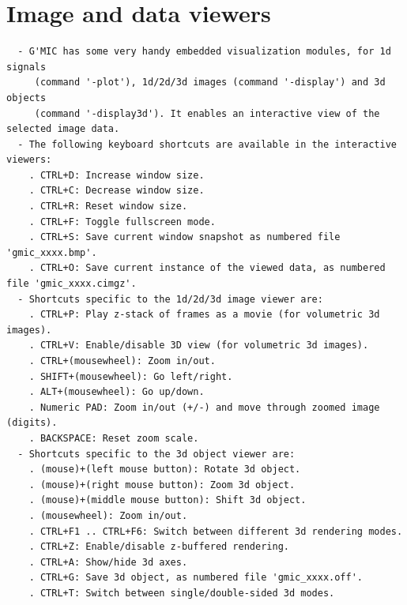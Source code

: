 \documentclass[a4paper,11pt,twoside]{book}
\begin{document}
\section{Image and data viewers}
\small
\begin{lstlisting}
  - G'MIC has some very handy embedded visualization modules, for 1d signals 
     (command '-plot'), 1d/2d/3d images (command '-display') and 3d objects 
     (command '-display3d'). It enables an interactive view of the selected image data. 
  - The following keyboard shortcuts are available in the interactive viewers: 
    . CTRL+D: Increase window size. 
    . CTRL+C: Decrease window size. 
    . CTRL+R: Reset window size. 
    . CTRL+F: Toggle fullscreen mode. 
    . CTRL+S: Save current window snapshot as numbered file 'gmic_xxxx.bmp'. 
    . CTRL+O: Save current instance of the viewed data, as numbered file 'gmic_xxxx.cimgz'. 
  - Shortcuts specific to the 1d/2d/3d image viewer are: 
    . CTRL+P: Play z-stack of frames as a movie (for volumetric 3d images). 
    . CTRL+V: Enable/disable 3D view (for volumetric 3d images). 
    . CTRL+(mousewheel): Zoom in/out. 
    . SHIFT+(mousewheel): Go left/right. 
    . ALT+(mousewheel): Go up/down. 
    . Numeric PAD: Zoom in/out (+/-) and move through zoomed image (digits). 
    . BACKSPACE: Reset zoom scale. 
  - Shortcuts specific to the 3d object viewer are: 
    . (mouse)+(left mouse button): Rotate 3d object. 
    . (mouse)+(right mouse button): Zoom 3d object. 
    . (mouse)+(middle mouse button): Shift 3d object. 
    . (mousewheel): Zoom in/out. 
    . CTRL+F1 .. CTRL+F6: Switch between different 3d rendering modes. 
    . CTRL+Z: Enable/disable z-buffered rendering. 
    . CTRL+A: Show/hide 3d axes. 
    . CTRL+G: Save 3d object, as numbered file 'gmic_xxxx.off'. 
    . CTRL+T: Switch between single/double-sided 3d modes.
\end{lstlisting}
\normalsize
\end{document}
